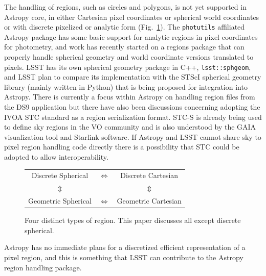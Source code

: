 \documentclass[]{spie}  %
\begin{document}
The handling of regions, such as circles and polygons, is not yet supported in Astropy core, in either Cartesian pixel coordinates or spherical world coordinates or with discrete pixelized or analytic form (Fig.~\ref{fig:regions}).
The \texttt{photutils} affiliated Astropy package has some basic support for analytic regions in pixel coordinates for photometry, and work has recently started on a regions package that can properly handle spherical geometry and world coordinate versions translated to pixels.
LSST has its own spherical geometry package in C++, \texttt{lsst::sphgeom}, and LSST plan to compare its implementation with the STScI spherical geometry library (mainly written in Python) that is being proposed for integration into Astropy.
There is currently a focus within Astropy on handling region files from the DS9 application\cite{2005ASPC..347..110J} but there have also been discussions concerning adopting the IVOA STC standard\cite{2007ivoa.spec.1030R} as a region serialization format.
STC-S is already being used to define sky regions in the VO community and is also understood by the GAIA visualization tool\cite{2009ASPC..411..575D} and Starlink software\cite{2010ASPC..434..213B,2014ASPC..485..391C}.
If Astropy and LSST cannot share sky to pixel region handling code directly there is a possibility that STC could be adopted to allow interoperability.

\begin{figure}[t]
\centering
\begin{tabular}{ccc}
  Discrete Spherical & $\Longleftrightarrow$ & Discrete Cartesian \\
  $\Updownarrow$ & &  $\Updownarrow$ \\
  Geometric Spherical & $\Longleftrightarrow$ & Geometric Cartesian \\
\end{tabular}
\vspace{10pt}
\caption{Four distinct types of region. This paper discusses all except discrete spherical.}
\label{fig:regions}
\end{figure}

Astropy has no immediate plans for a discretized efficient representation of a pixel region, and this is something that LSST can contribute to the Astropy region handling package.
\end{document}
